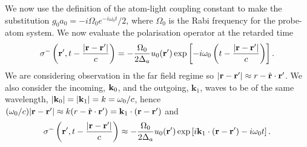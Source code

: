 We now use the definition of the atom-light coupling constant
\cite{Scully} to make the substitution
$g_0 a_0 = -i \Omega_0 e^{-i \omega_0 t} / 2$, where
$\Omega_0$ is the Rabi frequency for the probe-atom system. We now
evaluate the polarisation operator at the retarded time
\begin{equation}
  \sigma^- \left(\mathbf{r}^\prime, t - \frac{|\mathbf{r} - \mathbf{r}^\prime|}{c} \right) =
  -\frac{\Omega_0}{2 \Delta_a} u_0 (\mathbf{r}^\prime) \exp \left[-i \omega_0
    \left( t - \frac{|\mathbf{r} - \mathbf{r}^\prime|}{c} \right)\right].
\end{equation}
We are considering observation in the far field regime so
$|\mathbf{r} - \mathbf{r}^\prime| \approx r - \hat{\mathbf{r}} \cdot
\mathbf{r}^\prime$. We also consider the incoming, $\mathbf{k}_0$, and the
outgoing, $\mathbf{k}_1$, waves to be of the same wavelength,
$|\mathbf{k}_0| = |\mathbf{k}_1| = k = \omega_0 / c$, hence
$(\omega_0 / c) |\mathbf{r} - \mathbf{r}^\prime| \approx k (r - \hat{\mathbf{r}}
\cdot \mathbf{r}^\prime) = \mathbf{k}_1 \cdot (\mathbf{r} - \mathbf{r}^\prime )$ and
\begin{equation}
  \sigma^- \left(\mathbf{r}^\prime, t - \frac{|\mathbf{r} - \mathbf{r}^\prime|}{c} \right) \approx
  -\frac{\Omega_0}{2 \Delta_a} u_0 (\mathbf{r}^\prime) \exp \left[i
    \mathbf{k}_1 \cdot (\mathbf{r} - \mathbf{r}^\prime ) - i \omega_0 t \right].
\end{equation}

